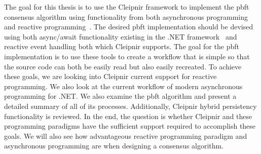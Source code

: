 The goal for this thesis is to use the Cleipnir framework to implement the \acl{pbft} consensus algorithm using functionality from both asynchronous programming and reactive programming~\cite{WEB:pbftmast}. The desired \ac{pbft} implementation should be devised using both async/await functionality existing in the .NET framework~\cite{DOC:AsyncAwait} and reactive event handling both which Cleipnir supports. The goal for the \ac{pbft} implementation is to use these tools to create a workflow that is simple so that the source code can both be easily read but also easily recreated. To achieve these goals, we are looking into Cleipnir current support for reactive programming. We also look at the current workflow of modern asynchronous programming for .NET. We also examine the \ac{pbft} algorithm and present a detailed summary of all of its processes. Additionally, Cleipnir hybrid persistency functionality is reviewed.
In the end, the question is whether Cleipnir and these programming paradigms have the sufficient support required to accomplish these goals. We will also see how advantageous reactive programming paradigm and asynchronous programming are when designing a consensus algorithm.
